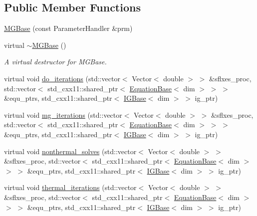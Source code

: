 \subsection*{Public Member Functions}
\begin{DoxyCompactItemize}
\item 
\hyperlink{class_m_g_base_ad938184229e773a339be9ba1fc487aa1}{M\+G\+Base} (const Parameter\+Handler \&prm)
\item 
virtual \hyperlink{class_m_g_base_a011e50e1caf44cfa3335b95d161ba14d}{$\sim$\+M\+G\+Base} ()
\begin{DoxyCompactList}\small\item\em A virtual destructor for M\+G\+Base. \end{DoxyCompactList}\item 
virtual void \hyperlink{class_m_g_base_a3586c47d901608bc42792c6de456b1cb}{do\+\_\+iterations} (std\+::vector$<$ Vector$<$ double $>$ $>$ \&sflxes\+\_\+proc, std\+::vector$<$ std\+\_\+cxx11\+::shared\+\_\+ptr$<$ \hyperlink{class_equation_base}{Equation\+Base}$<$ dim $>$ $>$ $>$ \&equ\+\_\+ptrs, std\+\_\+cxx11\+::shared\+\_\+ptr$<$ \hyperlink{class_i_g_base}{I\+G\+Base}$<$ dim $>$ $>$ ig\+\_\+ptr)
\item 
virtual void \hyperlink{class_m_g_base_a6ae523b6ee434588d85f8370413d0de9}{mg\+\_\+iterations} (std\+::vector$<$ Vector$<$ double $>$ $>$ \&sflxes\+\_\+proc, std\+::vector$<$ std\+\_\+cxx11\+::shared\+\_\+ptr$<$ \hyperlink{class_equation_base}{Equation\+Base}$<$ dim $>$ $>$ $>$ \&equ\+\_\+ptrs, std\+\_\+cxx11\+::shared\+\_\+ptr$<$ \hyperlink{class_i_g_base}{I\+G\+Base}$<$ dim $>$ $>$ ig\+\_\+ptr)
\item 
virtual void \hyperlink{class_m_g_base_a55ba9bef3616dd5eab9e3986f6e8e311}{nonthermal\+\_\+solves} (std\+::vector$<$ Vector$<$ double $>$ $>$ \&sflxes\+\_\+proc, std\+::vector$<$ std\+\_\+cxx11\+::shared\+\_\+ptr$<$ \hyperlink{class_equation_base}{Equation\+Base}$<$ dim $>$ $>$ $>$ \&equ\+\_\+ptrs, std\+\_\+cxx11\+::shared\+\_\+ptr$<$ \hyperlink{class_i_g_base}{I\+G\+Base}$<$ dim $>$ $>$ ig\+\_\+ptr)
\item 
virtual void \hyperlink{class_m_g_base_a9d3c6ab6e58f0119badb30feedb2ac4d}{thermal\+\_\+iterations} (std\+::vector$<$ Vector$<$ double $>$ $>$ \&sflxes\+\_\+proc, std\+::vector$<$ std\+\_\+cxx11\+::shared\+\_\+ptr$<$ \hyperlink{class_equation_base}{Equation\+Base}$<$ dim $>$ $>$ $>$ \&equ\+\_\+ptrs, std\+\_\+cxx11\+::shared\+\_\+ptr$<$ \hyperlink{class_i_g_base}{I\+G\+Base}$<$ dim $>$ $>$ ig\+\_\+ptr)
\end{DoxyCompactItemize}
